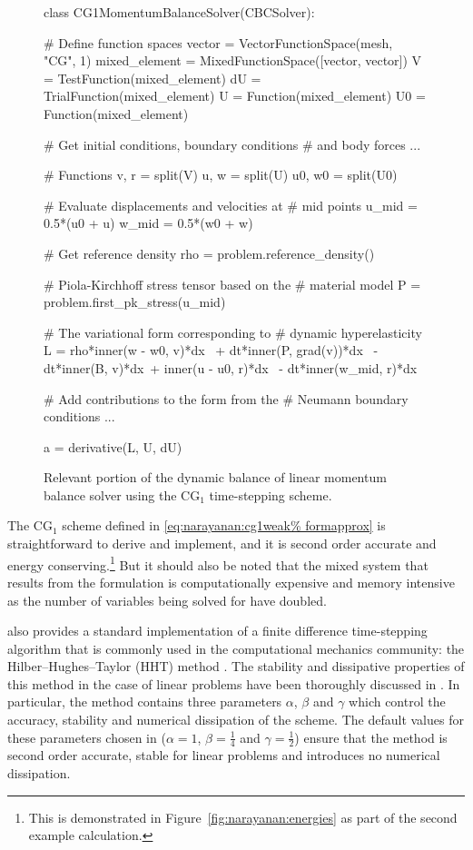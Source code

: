 \begin{figure}
\begin{python}
class CG1MomentumBalanceSolver(CBCSolver):

    # Define function spaces
    vector = VectorFunctionSpace(mesh, "CG", 1)
    mixed_element = MixedFunctionSpace([vector,
                                        vector])
    V = TestFunction(mixed_element)
    dU = TrialFunction(mixed_element)
    U = Function(mixed_element)
    U0 = Function(mixed_element)

    # Get initial conditions, boundary conditions
    # and body forces
    ...

    # Functions
    v, r = split(V)
    u, w = split(U)
    u0, w0 = split(U0)

    # Evaluate displacements and velocities at
    # mid points
    u_mid = 0.5*(u0 + u)
    w_mid = 0.5*(w0 + w)

    # Get reference density
    rho = problem.reference_density()

    # Piola-Kirchhoff stress tensor based on the
    # material model
    P = problem.first_pk_stress(u_mid)

    # The variational form corresponding to
    # dynamic hyperelasticity
    L = rho*inner(w - w0, v)*dx \
        + dt*inner(P, grad(v))*dx \
        - dt*inner(B, v)*dx\
        + inner(u - u0, r)*dx \
        - dt*inner(w_mid, r)*dx

    # Add contributions to the form from the
    # Neumann boundary conditions
    ...

    a = derivative(L, U, dU)
\end{python}
\caption{Relevant portion of the dynamic balance of linear momentum
  balance solver using the CG$_{1}$ time-stepping scheme.}
\label{code:narayanan:cg1}
\end{figure}

The CG$_{1}$ scheme defined in \eqref{eq:narayanan:cg1weak%
formapprox} is straightforward to derive and implement, and it is
second order accurate and energy conserving.\footnote{This is
  demonstrated in Figure~\ref{fig:narayanan:energies} as part of the
  second example calculation.}  But it should also be noted that the mixed
system that results from the formulation is computationally expensive
and memory intensive as the number of variables being solved for have
doubled.

\twist{} also provides a standard implementation of a finite
difference time-stepping algorithm that is commonly used in the
computational mechanics community: the Hilber--Hughes--Taylor (HHT)
method \citep{HilberHughesTaylor1977}. The stability and dissipative
properties of this method in the case of linear problems have been
thoroughly discussed in \citet{Hughes1987}. In particular, the method
contains three parameters $\alpha$, $\beta$ and $\gamma$ which control
the accuracy, stability and numerical dissipation of the scheme. The
default values for these parameters chosen in \twist{} ($\alpha = 1$,
$\beta = \frac{1}{4}$ and $\gamma = \frac{1}{2}$) ensure that the
method is second order accurate, stable for linear problems and
introduces no numerical dissipation.

